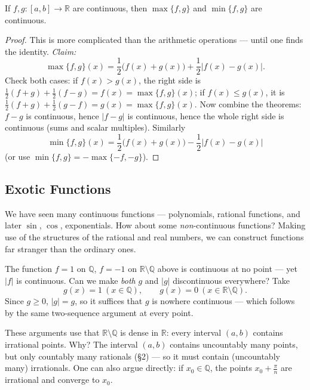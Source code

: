 \documentclass[11pt]{report}
\begin{document}
\begin{thmbox}
If $f, g: [a,b] \to \mathbb{R}$ are continuous, then $\max\{f,g\}$ and $\min\{f,g\}$ are continuous.
\end{thmbox}

\begin{proof}
This is more complicated than the arithmetic operations --- until one finds the identity. \emph{Claim:}
\[
\max\{f,g\}(x) = \frac12\bigl(f(x) + g(x)\bigr) + \frac12\bigl|f(x) - g(x)\bigr|.
\]
Check both cases: if $f(x) > g(x)$, the right side is $\tfrac12(f+g) + \tfrac12(f-g) = f(x) = \max\{f,g\}(x)$; if $f(x) \leq g(x)$, it is $\tfrac12(f+g) + \tfrac12(g-f) = g(x) = \max\{f,g\}(x)$. Now combine the theorems: $f - g$ is continuous, hence $|f-g|$ is continuous, hence the whole right side is continuous (sums and scalar multiples). Similarly
\[
\min\{f,g\}(x) = \frac12\bigl(f(x)+g(x)\bigr) - \frac12\bigl|f(x)-g(x)\bigr|
\]
(or use $\min\{f,g\} = -\max\{-f,-g\}$).
\end{proof}

\subsection{Exotic Functions}

We have seen many continuous functions --- polynomials, rational functions, and later $\sin$, $\cos$, exponentials. How about some \emph{non}-continuous functions? Making use of the structures of the rational and real numbers, we can construct functions far stranger than the ordinary ones.

\begin{exbox}
The function $f = 1$ on $\mathbb{Q}$, $f = -1$ on $\mathbb{R}\setminus\mathbb{Q}$ above is continuous at no point --- yet $|f|$ is continuous. Can we make \emph{both} $g$ and $|g|$ discontinuous everywhere? Take
\[
g(x) = 1 \ (x \in \mathbb{Q}), \qquad g(x) = 0 \ (x \in \mathbb{R}\setminus\mathbb{Q}).
\]
Since $g \geq 0$, $|g| = g$, so it suffices that $g$ is nowhere continuous --- which follows by the same two-sequence argument at every point.
\end{exbox}

\begin{rembox}
These arguments use that $\mathbb{R} \setminus \mathbb{Q}$ is dense in $\mathbb{R}$: every interval $(a,b)$ contains irrational points. Why? The interval $(a,b)$ contains uncountably many points, but only countably many rationals (\S 2) --- so it must contain (uncountably many) irrationals. One can also argue directly: if $x_0 \in \mathbb{Q}$, the points $x_0 + \tfrac{\pi}{n}$ are irrational and converge to $x_0$.
\end{rembox}
\end{document}
